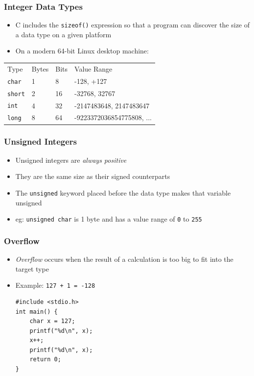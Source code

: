 \documentclass[14pt]{beamer}
\begin{document}
\begin{frame}
\frametitle{Integer Data Types}
\begin{itemize}
\item C includes the \texttt{sizeof()} expression so that a program can discover the size of a data type on a given platform
\item On a modern 64-bit Linux desktop machine:
\end{itemize}
\begin{table}[]
\begin{tabular}{llll}
Type & Bytes & Bits & Value Range                               \\
\texttt{char}      & 1            & 8           & -128, +127                                \\
\texttt{short}     & 2            & 16          & -32768, 32767      \\
\texttt{int}       & 4            & 32          & -2147483648, 2147483647                   \\
\texttt{long}      & 8            & 64          & -9223372036854775808, ...
\end{tabular}
\end{table}
\end{frame}

\begin{frame}
\frametitle{Unsigned Integers}
\begin{itemize}
\item Unsigned integers are \textit{always positive}
\item They are the same size as their signed counterparts
\item The \texttt{unsigned} keyword placed before the data type makes that variable unsigned
\item eg: \texttt{unsigned char} is 1 byte and has a value range of \texttt{0} to \texttt{255}
\end{itemize}
\end{frame}

\begin{frame}[fragile]
\frametitle{Overflow}
\small{
\begin{itemize}
\item \textit{Overflow} occurs when the result of a calculation is too big to fit into the target type
\item Example: \texttt{127 + 1 = -128}
\begin{lstlisting}[style=CStyle,caption=\texttt{overflow.c}]
#include <stdio.h>
int main() {
	char x = 127;
	printf("%d\n", x);
	x++;
	printf("%d\n", x);
	return 0;
}
\end{lstlisting}

\end{itemize}
}
\end{frame}
\end{document}
